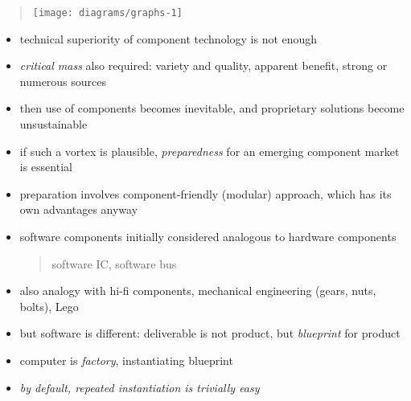 \documentclass{sepslide-soa-faked} %
\begin{document}
\begin{slide}
\begin{quote} 
\texttt{[image: diagrams/graphs-1]} 
\end{quote}
\label{fig:makeall-vs-buyall}
\end{slide}

\begin{slide}
\begin{itemize}
\item technical superiority of component technology is not enough
\item \emph{critical mass} also required:
  variety and quality, apparent benefit, strong or numerous sources
\item then use of components becomes inevitable, and proprietary solutions
become unsustainable
\item if such a vortex is plausible, \emph{preparedness} for an emerging
component market is essential
\item preparation involves component-friendly (modular) approach, which
has its own advantages anyway
\end{itemize}
\end{slide}

\begin{slide}
\begin{itemize}
\item software components initially considered analogous to hardware components
  \begin{quote} software IC, software bus \end{quote}
\item also analogy with hi-fi components, 
  mechanical engineering (gears, nuts, bolts), Lego
\item but software is different:
  deliverable is not product, but \emph{blueprint} for product
\item computer is \emph{factory}, instantiating blueprint
\item \textit{by default, repeated instantiation is trivially easy}
\end{itemize}
\end{slide}
\end{document}
